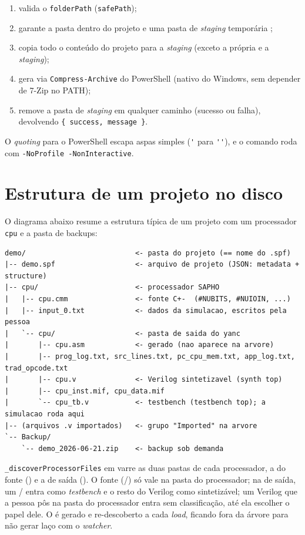 \begin{enumerate}[leftmargin=1.8em]
  \item valida o \lstinline|folderPath| (\lstinline|safePath|);
  \item garante a pasta  dentro do projeto e uma pasta de
    \emph{staging} temporária ;
  \item copia todo o conteúdo do projeto para a \emph{staging} (exceto a própria
     e a \emph{staging});
  \item gera  via
    \lstinline|Compress-Archive| do PowerShell (nativo do Windows, sem depender
    de 7-Zip no PATH);
  \item remove a pasta de \emph{staging} em qualquer caminho (sucesso ou
    falha), devolvendo \lstinline|{ success, message }|.
\end{enumerate}

O \emph{quoting} para o PowerShell escapa aspas simples (\lstinline|'| para
\lstinline|''|), e o comando roda com \lstinline|-NoProfile -NonInteractive|.

\section{Estrutura de um projeto no disco}

O diagrama abaixo resume a estrutura típica de um projeto com um processador
\lstinline|cpu| e a pasta de backups:

\begin{lstlisting}
demo/                          <- pasta do projeto (== nome do .spf)
|-- demo.spf                   <- arquivo de projeto (JSON: metadata + structure)
|-- cpu/                       <- processador SAPHO
|   |-- cpu.cmm                <- fonte C+-  (#NUBITS, #NUIOIN, ...)
|   |-- input_0.txt            <- dados da simulacao, escritos pela pessoa
|   `-- cpu/                   <- pasta de saida do yanc
|       |-- cpu.asm            <- gerado (nao aparece na arvore)
|       |-- prog_log.txt, src_lines.txt, pc_cpu_mem.txt, app_log.txt, trad_opcode.txt
|       |-- cpu.v              <- Verilog sintetizavel (synth top)
|       |-- cpu_inst.mif, cpu_data.mif
|       `-- cpu_tb.v           <- testbench (testbench top); a simulacao roda aqui
|-- (arquivos .v importados)   <- grupo "Imported" na arvore
`-- Backup/
    `-- demo_2026-06-21.zip    <- backup sob demanda
\end{lstlisting}

\begin{nota}
\lstinline|_discoverProcessorFiles| em  varre as duas pastas
de cada processador, a do fonte () e a de saída
(). O fonte (/) só vale na pasta do
processador; na de saída, um / entra como
\emph{testbench} e o resto do Verilog como sintetizável; um Verilog que a pessoa
pôs na pasta do processador entra sem classificação, até ela escolher o papel
dele. O  é gerado e re-descoberto a cada \emph{load}, ficando
fora da árvore para não gerar laço com o \emph{watcher}.
\end{nota}
